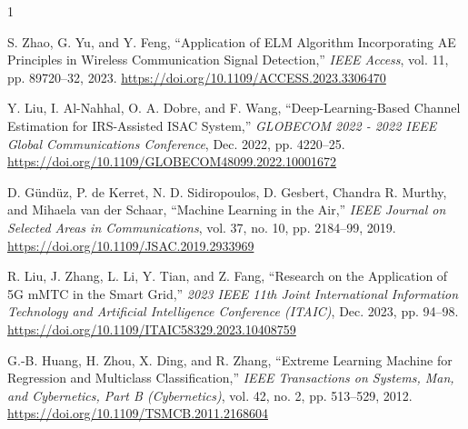 \documentclass[10pt, conference]{IEEEtran}
\begin{document}
\begin{thebibliography}{1}

S. Zhao, G. Yu, and Y. Feng, ``Application of ELM Algorithm Incorporating AE Principles in Wireless Communication Signal Detection,'' \textit{IEEE Access}, vol. 11, pp. 89720–32, 2023. \url{https://doi.org/10.1109/ACCESS.2023.3306470}

Y. Liu, I. Al-Nahhal, O. A. Dobre, and F. Wang, ``Deep-Learning-Based Channel Estimation for IRS-Assisted ISAC System,'' \textit{GLOBECOM 2022 - 2022 IEEE Global Communications Conference}, Dec. 2022, pp. 4220–25. \url{https://doi.org/10.1109/GLOBECOM48099.2022.10001672}

D. Gündüz, P. de Kerret, N. D. Sidiropoulos, D. Gesbert, Chandra R. Murthy, and Mihaela van der Schaar, ``Machine Learning in the Air,'' \textit{IEEE Journal on Selected Areas in Communications}, vol. 37, no. 10, pp. 2184–99, 2019. \url{https://doi.org/10.1109/JSAC.2019.2933969}

R. Liu, J. Zhang, L. Li, Y. Tian, and Z. Fang, ``Research on the Application of 5G mMTC in the Smart Grid,'' \textit{2023 IEEE 11th Joint International Information Technology and Artificial Intelligence Conference (ITAIC)}, Dec. 2023, pp. 94--98. \url{https://doi.org/10.1109/ITAIC58329.2023.10408759}

G.-B. Huang, H. Zhou, X. Ding, and R. Zhang, ``Extreme Learning Machine for Regression and Multiclass Classification,'' \textit{IEEE Transactions on Systems, Man, and Cybernetics, Part B (Cybernetics)}, vol. 42, no. 2, pp. 513--529, 2012. \url{https://doi.org/10.1109/TSMCB.2011.2168604}

\end{thebibliography}
\end{document}
